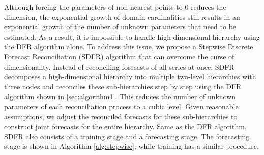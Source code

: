 \documentclass[a4paper,review,12pt,authoryear]{elsarticle}
\begin{document}
    Although forcing the parameters of non-nearest points to $0$ reduces the dimension, the exponential growth of domain cardinalities still results in an exponential growth of the number of unknown parameters that need to be estimated.
    As a result, it is impossible to handle high-dimensional hierarchy using the DFR algorithm alone.
    To address this issue, we propose a Stepwise Discrete Forecast Reconciliation (SDFR) algorithm that can overcome the curse of dimensionality.
    Instead of reconciling forecasts of all series at once,  SDFR
    decomposes a high-dimensional hierarchy into multiple two-level hierarchies with three nodes and reconciles these sub-hierarchies step by step using the DFR algorithm shown in \ref{sec:algorithm1}.
    This reduces the number of unknown parameters of each reconciliation process to a cubic level.
    Given reasonable assumptions, we adjust the reconciled forecasts for these sub-hierarchies to construct joint forecasts for the entire hierarchy.
    Same as the DFR algorithm, SDFR also consists of a training stage and a forecasting stage. The forecasting stage is shown in Algorithm \ref{alg:stepwise}, while training has a similar procedure.
\end{document}
